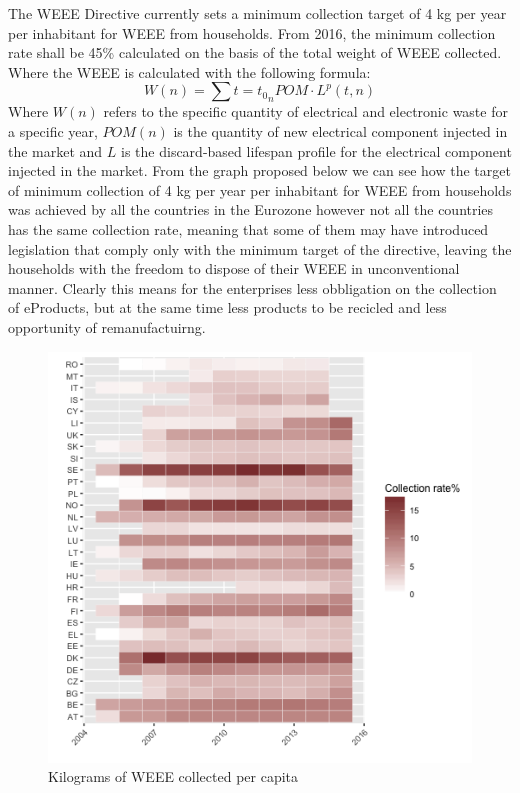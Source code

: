 \documentclass{article}
\begin{document}
  The WEEE Directive currently sets a minimum collection target of 4 kg per year per inhabitant for WEEE from households. From 2016, the minimum collection rate shall be 45\% calculated on the basis of the total weight of WEEE collected. Where the WEEE is calculated with the following formula:
  $$
  W (n) = \sum{t = t_0}_{n} POM \cdot L^p(t,n)
  $$
  Where $W(n)$ refers to the specific quantity of electrical and electronic waste for a specific year, $POM(n)$ is the quantity of new electrical component injected in the market and $L$ is the discard-based lifespan profile for the electrical component injected in the market. From the graph proposed below we can see how the target of minimum collection of 4 kg per year per inhabitant for WEEE from households was achieved by all the countries in the Eurozone however not all the countries has the same collection rate, meaning that some of them may have introduced legislation that comply only with the minimum target of the directive, leaving the households with the freedom to dispose of their WEEE in unconventional manner. Clearly this means for the enterprises less obbligation on the collection of eProducts, but at the same time less products to be recicled and less opportunity of remanufactuirng.

  \begin{figure}
  \centering
  \includegraphics[width=0.8\linewidth]{Images/heatmap.png}
  \caption{Kilograms of WEEE collected per capita}
  \end{figure}
\end{document}
